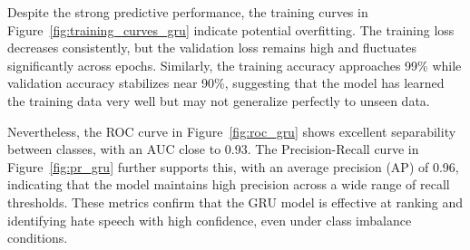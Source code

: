 Despite the strong predictive performance, the training curves in Figure~\ref{fig:training_curves_gru} indicate potential overfitting. The training loss decreases consistently, but the validation loss remains high and fluctuates significantly across epochs. Similarly, the training accuracy approaches 99\% while validation accuracy stabilizes near 90\%, suggesting that the model has learned the training data very well but may not generalize perfectly to unseen data.

Nevertheless, the ROC curve in Figure~\ref{fig:roc_gru} shows excellent separability between classes, with an AUC close to 0.93. The Precision-Recall curve in Figure~\ref{fig:pr_gru} further supports this, with an average precision (AP) of 0.96, indicating that the model maintains high precision across a wide range of recall thresholds. These metrics confirm that the GRU model is effective at ranking and identifying hate speech with high confidence, even under class imbalance conditions.